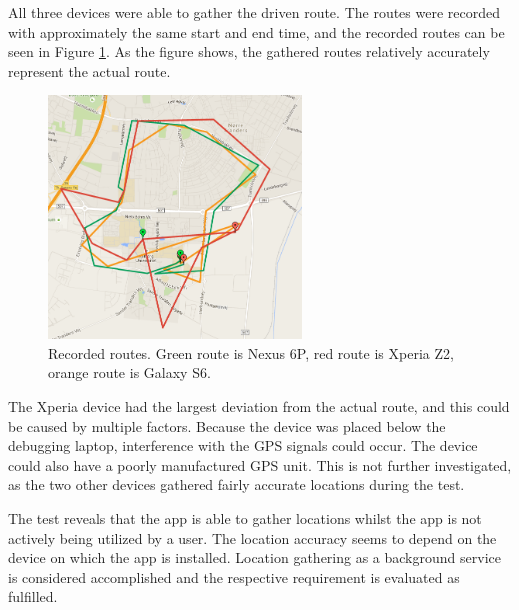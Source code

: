 All three devices were able to gather the driven route. 
The routes were recorded with approximately the same start and end time, and the recorded routes can be seen in Figure \ref{fig:testrouterecordings}. 
As the figure shows, the gathered routes relatively accurately represent the actual route.

\begin{figure}[h]
	\centering
	\includegraphics[width=0.6\textwidth]{figures/testRouteRecordings.png}
	\caption{Recorded routes. Green route is Nexus 6P, red route is Xperia Z2, orange route is Galaxy S6.}
	\label{fig:testrouterecordings}
\end{figure}

The Xperia device had the largest deviation from the actual route, and this could be caused by multiple factors.
Because the device was placed below the debugging laptop, interference with the GPS signals could occur.
The device could also have a poorly manufactured GPS unit.
This is not further investigated, as the two other devices gathered fairly accurate locations during the test.



The test reveals that the app is able to gather locations whilst the app is not actively being utilized by a user.
The location accuracy seems to depend on the device on which the app is installed.
Location gathering as a background service is considered accomplished and the respective requirement is evaluated as fulfilled.
